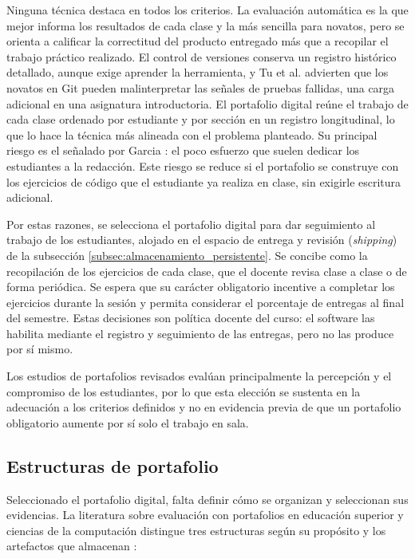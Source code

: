 Ninguna técnica destaca en todos los criterios. La evaluación automática es la que mejor informa los resultados de cada clase y la más sencilla para novatos, pero se orienta a calificar la correctitud del producto entregado más que a recopilar el trabajo práctico realizado. El control de versiones conserva un registro histórico detallado, aunque exige aprender la herramienta, y Tu et al. \cite{tu2022github} advierten que los novatos en Git pueden malinterpretar las señales de pruebas fallidas, una carga adicional en una asignatura introductoria. El portafolio digital reúne el trabajo de cada clase ordenado por estudiante y por sección en un registro longitudinal, lo que lo hace la técnica más alineada con el problema planteado. Su principal riesgo es el señalado por Garcia \cite{garcia2025portfolios}: el poco esfuerzo que suelen dedicar los estudiantes a la redacción. Este riesgo se reduce si el portafolio se construye con los ejercicios de código que el estudiante ya realiza en clase, sin exigirle escritura adicional.

Por estas razones, se selecciona el portafolio digital para dar seguimiento al trabajo de los estudiantes, alojado en el espacio de entrega y revisión (\textit{shipping}) de la subsección \ref{subsec:almacenamiento_persistente}. Se concibe como la recopilación de los ejercicios de cada clase, que el docente revisa clase a clase o de forma periódica. Se espera que su carácter obligatorio incentive a completar los ejercicios durante la sesión y permita considerar el porcentaje de entregas al final del semestre. Estas decisiones son política docente del curso: el software las habilita mediante el registro y seguimiento de las entregas, pero no las produce por sí mismo.

Los estudios de portafolios revisados evalúan principalmente la percepción y el compromiso de los estudiantes, por lo que esta elección se sustenta en la adecuación a los criterios definidos y no en evidencia previa de que un portafolio obligatorio aumente por sí solo el trabajo en sala.

\subsection{Estructuras de portafolio}
\label{subsec:estructuras_portafolio}

Seleccionado el portafolio digital, falta definir cómo se organizan y seleccionan sus evidencias. La literatura sobre evaluación con portafolios en educación superior y ciencias de la computación distingue tres estructuras según su propósito y los artefactos que almacenan \cite{olstad2025eportfolios, garcia2025portfolios}:

